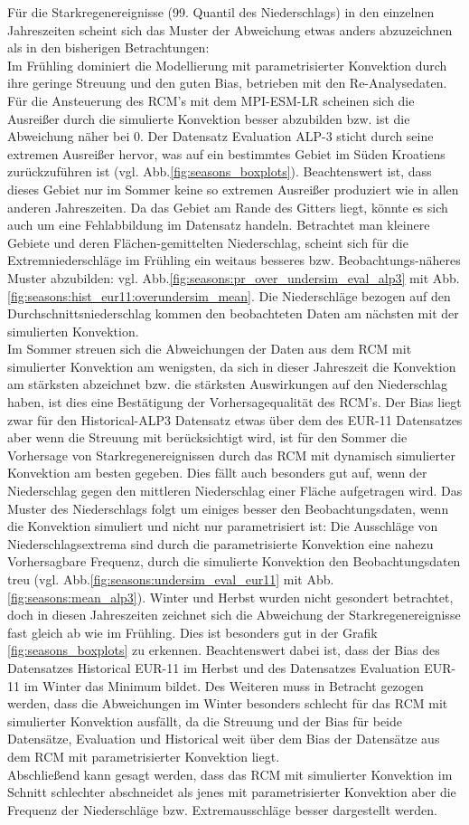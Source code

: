 Für die Starkregenereignisse (99. Quantil des Niederschlags) in den einzelnen Jahreszeiten scheint sich das Muster der Abweichung etwas anders abzuzeichnen als in den bisherigen Betrachtungen:\\
Im Frühling dominiert die Modellierung mit parametrisierter Konvektion durch ihre geringe Streuung und den guten Bias, betrieben mit den Re-Analysedaten. Für die Ansteuerung des RCM's mit dem MPI-ESM-LR scheinen sich die Ausreißer durch die simulierte Konvektion besser abzubilden bzw. ist die Abweichung näher bei 0. Der Datensatz Evaluation ALP-3 sticht durch seine extremen Ausreißer hervor, was auf ein bestimmtes Gebiet im Süden Kroatiens zurückzuführen ist (vgl. Abb.\ref{fig:seasons_boxplots}). Beachtenswert ist, dass dieses Gebiet nur im Sommer keine so extremen Ausreißer produziert wie in allen anderen Jahreszeiten. Da das Gebiet am Rande des Gitters liegt, könnte es sich auch um eine Fehlabbildung im Datensatz handeln. Betrachtet man kleinere Gebiete und deren Flächen-gemittelten Niederschlag, scheint sich für die Extremniederschläge im Frühling ein weitaus besseres bzw. Beobachtungs-näheres Muster abzubilden: vgl. Abb.\ref{fig:seasons:pr_over_undersim_eval_alp3} mit Abb.\ref{fig:seasons:hist_eur11:overundersim_mean}. Die Niederschläge bezogen auf den Durchschnittsniederschlag kommen den beobachteten Daten am nächsten mit der simulierten Konvektion.\\
Im Sommer streuen sich die Abweichungen der Daten aus dem RCM mit simulierter Konvektion am wenigsten, da sich in dieser Jahreszeit die Konvektion am stärksten abzeichnet bzw. die stärksten Auswirkungen auf den Niederschlag haben, ist dies eine Bestätigung der Vorhersagequalität des RCM's. Der Bias liegt zwar für den Historical-ALP3 Datensatz etwas über dem des EUR-11 Datensatzes aber wenn die Streuung mit berücksichtigt wird, ist für den Sommer die Vorhersage von Starkregenereignissen durch das RCM mit dynamisch simulierter Konvektion am besten gegeben. Dies fällt auch besonders gut auf, wenn der Niederschlag gegen den mittleren Niederschlag einer Fläche aufgetragen wird. Das Muster des Niederschlags folgt um einiges besser den Beobachtungsdaten, wenn die Konvektion simuliert und nicht nur parametrisiert ist: Die Ausschläge von Niederschlagsextrema sind durch die parametrisierte Konvektion eine nahezu Vorhersagbare Frequenz, durch die simulierte Konvektion den Beobachtungsdaten treu (vgl. Abb.\ref{fig:seasons:undersim_eval_eur11} mit Abb.\ref{fig:seasons:mean_alp3}).
Winter und Herbst wurden nicht gesondert betrachtet, doch in diesen Jahreszeiten zeichnet sich die Abweichung der Starkregenereignisse fast gleich ab wie im Frühling. Dies ist besonders gut in der Grafik \ref{fig:seasons_boxplots} zu erkennen. Beachtenswert dabei ist, dass der Bias des Datensatzes Historical EUR-11 im Herbst und des Datensatzes Evaluation EUR-11 im Winter das Minimum bildet. Des Weiteren muss in Betracht gezogen werden, dass die Abweichungen im Winter besonders schlecht für das RCM mit simulierter Konvektion ausfällt, da die Streuung und der Bias für beide Datensätze, Evaluation und Historical weit über dem Bias der Datensätze aus dem RCM mit parametrisierter Konvektion liegt.\\
Abschließend kann gesagt werden, dass das RCM mit simulierter Konvektion im Schnitt schlechter abschneidet als jenes mit parametrisierter Konvektion aber die Frequenz der Niederschläge bzw. Extremausschläge besser dargestellt werden.